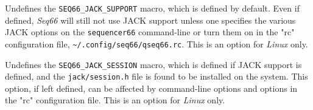         Undefines the \texttt{SEQ66\_JACK\_SUPPORT} macro, which is
        defined by default.  Even if defined,
        \textsl{Seq66} will still not use JACK support unless
        one specifies the various JACK options on the \texttt{sequencer66}
        command-line or turn them on in the "rc" configuration file,
        \texttt{\textasciitilde/.config/seq66/qseq66.rc}.
        This is an option for \textsl{Linux} only.

        Undefines the \texttt{SEQ66\_JACK\_SESSION} macro, which is
        defined if JACK support is defined, and the
        \texttt{jack/session.h} file is found to be installed on the system.
        This option, if left defined, can be affected by
        command-line options and options in the "rc" configuration file.
        This is an option for \textsl{Linux} only.

%
%
%

